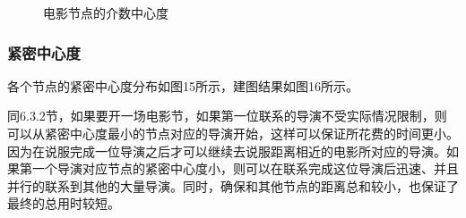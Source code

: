 \documentclass[UTF8, onecolumn, a4paper]{article}
\begin{document}
\begin{center}
\begin{figure}[ht]
\begin{minipage}[b]{0.95\linewidth}
\begin{minipage}[b]{0.46\linewidth}
				\caption{电影节点的介数中心度}
			\end{minipage}
		\end{minipage}
	\end{figure}
\end{center}
\subsubsection{紧密中心度}
    各个节点的紧密中心度分布如图15所示，建图结果如图16所示。
    
    同6.3.2节，如果要开一场电影节，如果第一位联系的导演不受实际情况限制，则可以从紧密中心度最小的节点对应的导演开始，这样可以保证所花费的时间更小。因为在说服完成一位导演之后才可以继续去说服距离相近的电影所对应的导演。如果第一个导演对应节点的紧密中心度小，则可以在联系完成这位导演后迅速、并且并行的联系到其他的大量导演。同时，确保和其他节点的距离总和较小，也保证了最终的总用时较短。
\end{document}
